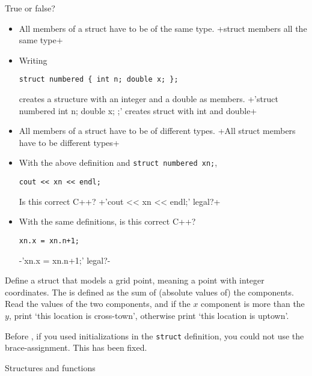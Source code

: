 \begin{review}
  \label{rev:struct-def}
  True or false?

  \footnotesize
  \begin{itemize}
  \item All members of a struct have to be of the same type.
    \slackpollTF+struct members all the same type+
  \item Writing
\begin{lstlisting}
struct numbered { int n; double x; };
\end{lstlisting}
creates a structure with an integer and a double as members.
\slackpollTF+'struct numbered { int n; double x; };' creates struct with int and double+
\item All members of a struct have to be of different types.
  \slackpollTF+All struct members have to be different types+
\item With the above definition and \lstinline$struct numbered xn;$,
\begin{lstlisting}
cout << xn << endl;
\end{lstlisting}
Is this correct C++?
\slackpollTF+'cout << xn << endl;' legal?+
\item With the same definitions, is this correct C++?
\begin{lstlisting}
xn.x = xn.n+1;
\end{lstlisting}
\slackpollTF-'xn.x = xn.n+1;' legal?-
  \end{itemize}
\end{review}

\begin{exercise}
  \label{ex:gridstruct}
  Define a struct  that models a grid point,
  meaning a point with integer coordinates.
  The  is defined
  as the sum of (absolute values of) the components.
  Read the values of the two components, and
  if the $x$ component is more than the $y$,
  print `this location is cross-town',
  otherwise print `this location is uptown'.
\end{exercise}

\begin{remark}
  Before ,
  if you used initializations in the \lstinline$struct$ definition,
  you could not use the brace-assignment. This has been fixed.
\end{remark}

 {Structures and functions}

